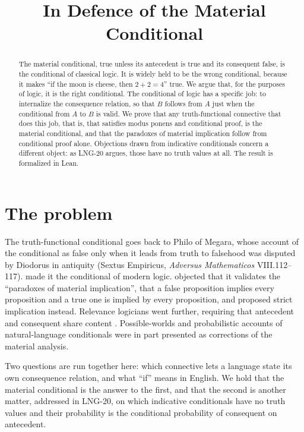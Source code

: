 \documentclass{situationist-preprint}
\title{In Defence of the Material Conditional}
\begin{document}
\maketitle

\begin{abstract}
The material conditional, true unless its antecedent is true and its consequent false, is the conditional of classical logic. It is widely held to be the wrong conditional, because it makes \enquote{if the moon is cheese, then $2+2=4$} true. We argue that, for the purposes of logic, it is the right conditional. The conditional of logic has a specific job: to internalize the consequence relation, so that $B$ follows from $A$ just when the conditional from $A$ to $B$ is valid. We prove that any truth-functional connective that does this job, that is, that satisfies modus ponens and conditional proof, is the material conditional, and that the paradoxes of material implication follow from conditional proof alone. Objections drawn from indicative conditionals concern a different object: as LNG-20 argues, those have no truth values at all. The result is formalized in Lean.
\end{abstract}

\section{The problem}

The truth-functional conditional goes back to Philo of Megara, whose account of the conditional as false only when it leads from truth to falsehood was disputed by Diodorus in antiquity (Sextus Empiricus, \emph{Adversus Mathematicos} VIII.112--117). \citet{Frege1879} made it the conditional of modern logic. \citet{LewisCI1912} objected that it validates the \enquote{paradoxes of material implication}, that a false proposition implies every proposition and a true one is implied by every proposition, and proposed strict implication instead. Relevance logicians went further, requiring that antecedent and consequent share content \citep{AndersonBelnap1975}. Possible-worlds \citep{Stalnaker1968} and probabilistic \citep{Adams1975,Edgington1995} accounts of natural-language conditionals were in part presented as corrections of the material analysis.

Two questions are run together here: which connective lets a language state its own consequence relation, and what \enquote{if} means in English. We hold that the material conditional is the answer to the first, and that the second is another matter, addressed in LNG-20, on which indicative conditionals have no truth values and their probability is the conditional probability of consequent on antecedent.
\end{document}
